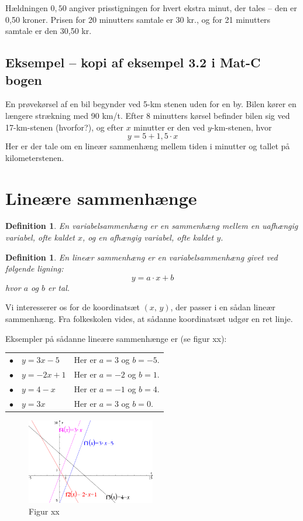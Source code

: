 \documentclass[12pt,oneside,a4paper]{article}
\newtheorem{mydef}[thm]{Definition}
\begin{document}
Hældningen $0,50$ angiver prisstigningen for hvert ekstra minut, der tales --
den er 0,50 kroner.  Prisen for 20 minutters samtale er 30 kr., og for 21
minutters samtale er den 30,50 kr.

\subsection{Eksempel -- kopi af eksempel 3.2 i Mat-C bogen}
En prøvekørsel af en bil begynder ved 5-km stenen uden for en by. Bilen kører
en længere strækning med 90 km/t. Efter 8 minutters kørsel befinder bilen sig
ved 17-km-stenen (hvorfor?), og efter $x$ minutter er den ved $y$-km-stenen,
hvor
$$
y = 5 + 1,5\cdot x
$$
Her er der tale om en lineær sammenhæng mellem tiden i minutter og tallet på
kilometerstenen.

\section{Lineære sammenhænge}
\begin{mydef}
    En variabelsammenhæng er en sammenhæng mellem en uafhængig variabel, ofte
    kaldet $x$, og en afhængig variabel, ofte kaldet $y$.
\end{mydef}

\begin{mydef}
    En lineær sammenhæng er en variabelsammenhæng givet ved følgende ligning:
    $$
    y = a\cdot x + b
    $$
    hvor $a$ og $b$ er tal.
\end{mydef}

Vi interesserer os for de koordinatsæt $(x,\,y)$, der passer i en sådan lineær
sammenhæng. Fra folkeskolen vides, at sådanne koordinatsæt udgør en ret linje.

Eksempler på sådanne lineære sammenhænge er (se figur xx):

\begin{tabular}{ll}
    $\bullet\quad y=3x-5$  & Her er $a=3$ og $b=-5$. \\
    $\bullet\quad y=-2x+1$ & Her er $a=-2$ og $b=1$. \\
    $\bullet\quad y=4-x$   & Her er $a=-1$ og $b=4$. \\
    $\bullet\quad y=3x$    & Her er $a=3$ og $b=0$.
\end{tabular}

\begin{figure}[ht]
    \centering
    \includegraphics[width=0.5\textwidth]{fig-def-22}
    \caption{Figur xx}
    \label{fig-def-22}
\end{figure}
\end{document}
